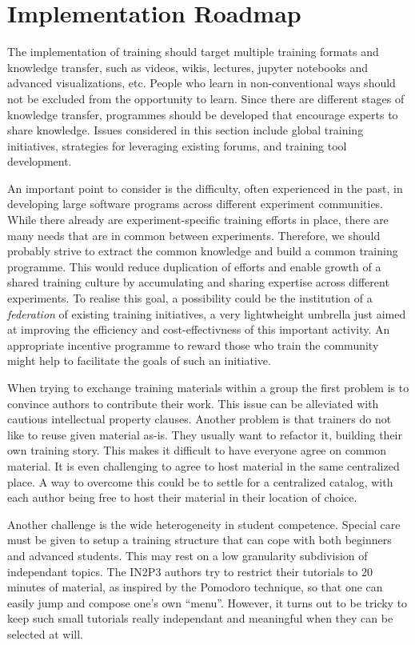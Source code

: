 \documentclass[12pt,a4paper]{article}
\begin{document}
\section{Implementation Roadmap}
The implementation of training should target multiple training formats and
knowledge transfer, such as videos, wikis, lectures, jupyter notebooks and
advanced visualizations, etc.
People who learn in non-conventional ways should not be excluded from the
opportunity to learn. 
Since there are different stages of knowledge transfer,
programmes should be developed that encourage experts to share knowledge. Issues
considered in this section include global training initiatives, strategies for
leveraging existing forums, and training tool development.

An important point to consider is the difficulty, often experienced in the past,
in developing large software programs across different experiment communities.
While there already are experiment-specific training efforts in place, there are
many needs that are in common between experiments. Therefore, we should probably
strive to extract the common knowledge and build a common training programme. This
would reduce duplication of efforts and enable growth of a shared training
culture by accumulating and sharing expertise across different experiments.
To realise this goal, a possibility could be the institution of a {\em
federation} of existing training initiatives, a very lightwheight umbrella just
aimed at improving the efficiency and cost-effectivness of this important
activity. An appropriate incentive programme to reward those who train the community 
might help to facilitate the goals of such an initiative.

When trying to exchange training materials within a group the first problem is
to convince authors to contribute their work. This issue
can be alleviated with cautious intellectual property clauses. Another
problem is that trainers do not like to reuse given material as-is. They usually
want to refactor it, building their own training story.
This makes it difficult to have everyone agree on common material.
It is even challenging to agree to host material in the same
centralized place. A way to overcome this could be to settle for a centralized
catalog, with each author being free to host their material in their location
of choice.

Another challenge is the wide heterogeneity in
student competence. Special care must be given to setup
a training structure that can cope with both beginners and advanced students.
This may rest on a low granularity subdivision of independant topics.
The IN2P3 authors try to restrict their tutorials to 20 minutes
of material, as inspired by the Pomodoro technique, so that one can easily jump
and compose one's own ``menu''. However, it turns out to be tricky to keep such
small tutorials really independant and meaningful when they can be selected at
will.
\end{document}
